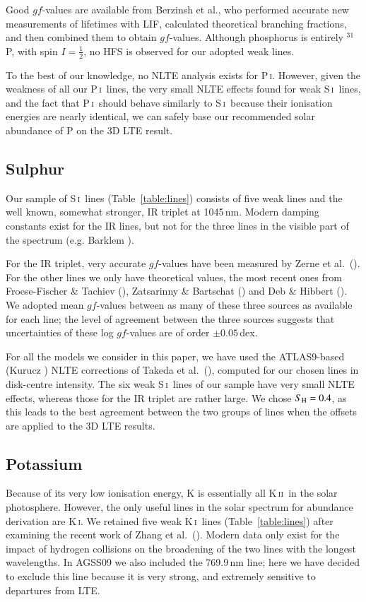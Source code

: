 \documentclass[traditabstract]{aa}
\newcommand{\altphosi}{P\,\textsc{i}}
\newcommand{\altsuli}{S\,\textsc{i}}
\newcommand{\altki}{K\,\textsc{i}}
\newcommand{\altkii}{K\,\textsc{ii}}
\newcommand{\phosi}{\altphosi\ }
\newcommand{\suli}{\altsuli\ }
\newcommand{\ki}{\altki\ }
\newcommand{\kii}{\altkii\ }
\begin{document}
Good $gf$-values are available from Berzinsh et al., who performed accurate new measurements of lifetimes with LIF, calculated theoretical branching fractions, and then combined them to obtain $gf$-values.  Although phosphorus is entirely $^{31}$P, with spin $I=\frac12$, no HFS is observed for our adopted weak lines.

To the best of our knowledge, no NLTE analysis exists for \altphosi. However, given the weakness of all our \phosi lines, the very small NLTE effects found for weak \suli lines, and the fact that \phosi should behave similarly to \suli because their ionisation energies are nearly identical, we can safely base our recommended solar abundance of P on the 3D LTE result.


\subsection{Sulphur}
Our sample of \suli lines (Table~\ref{table:lines}) consists of five weak lines and the well known, somewhat stronger, IR triplet at 1045\,nm. Modern damping constants exist for the IR lines, but not for the three lines in the visible part of the spectrum (e.g. Barklem \cite{bark2}).

For the IR triplet, very accurate $gf$-values have been measured by Zerne et al.\ (\cite{zern}). For the other lines we only have theoretical values, the most recent ones from Froese-Fischer \& Tachiev (\cite{FF}), Zatsarinny \& Bartschat (\cite{zats}) and Deb \& Hibbert (\cite{deb}). We adopted mean $gf$-values between as many of these three sources as available for each line; the level of agreement between the three sources suggests that uncertainties of these log $gf$-values are of order $\pm 0.05$\,dex.

For all the models we consider in this paper, we have used the ATLAS9-based (Kurucz \cite{atlas9}) NLTE corrections of Takeda et al.\ (\cite{tak1}), computed for our chosen lines in disk-centre intensity.  The six weak \suli lines of our sample have very small NLTE effects, whereas those for the IR triplet are rather large.  We chose $S_{\rm H}=0.4$, as this leads to the best agreement between the two groups of lines when the offsets are applied to the 3D LTE results.


\subsection{Potassium}
Because of its very low ionisation energy, K is essentially all \kii in the solar photosphere.  However, the only useful lines in the solar spectrum for abundance derivation are \altki.  We retained five weak \ki lines (Table~\ref{table:lines}) after examining the recent work of Zhang et al.\ (\cite{zhan}).  Modern data only exist for the impact of hydrogen collisions on the broadening of the two lines with the longest wavelengths.  In AGSS09 we also included the 769.9\,nm line; here we have decided to exclude this line because it is very strong, and extremely sensitive to departures from LTE.
\end{document}
